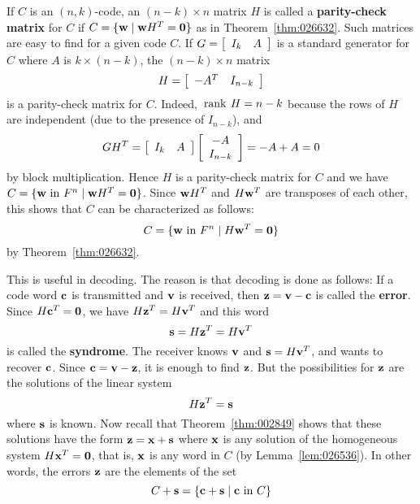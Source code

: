 \noindent If $C$ is an $(n, k)$-code, an $(n - k) \times n$ matrix $H$ is called a \textbf{parity-check matrix} for $C$ if $C = \{\textbf{w} \mid \textbf{w}H^{T} = \textbf{0}\}$ as in Theorem~\ref{thm:026632}. Such matrices are easy to find for a given code $C$. If $G = 
\left[ \begin{array}{cc}
I_k & A
\end{array} \right]$ is a standard generator for $C$ where $A$ is $k \times (n - k)$, the $(n - k) \times n$ matrix
\begin{equation*}
H = \left[\begin{array}{cc}
-A^T & I_{n-k}
\end{array}\right]
\end{equation*}
is a parity-check matrix for $C$. Indeed, $\thinspace\operatorname{rank\medspace} H = n - k$ because the rows of $H$ are independent (due to the presence of $I_{n - k}$), and
\begin{equation*}
GH^T = \left[\begin{array}{cc}
I_{k} & A
\end{array}\right]\left[\begin{array}{c}
-A \\ 
I_{n-k}
\end{array}\right] = -A + A = 0
\end{equation*}
by block multiplication. Hence $H$ is a parity-check matrix for $C$ and we have $C = \{\textbf{w} \mbox{ in } F^{n} \mid \textbf{w}H^{T} = \textbf{0}\}$. Since $\textbf{w}H^{T}$ and $H\textbf{w}^{T}$ are transposes of each other, this shows that $C$ can be characterized as follows:
\begin{equation*}
C = \{\textbf{w} \mbox{ in } F^n \mid H \textbf{w}^T = \textbf{0} \}
\end{equation*}
by Theorem~\ref{thm:026632}.

This is useful in decoding. The reason is that decoding is done as follows: If a code word $\textbf{c}$ is transmitted and $\textbf{v}$ is received, then $\textbf{z} = \textbf{v} - \textbf{c}$ is called the \textbf{error}. Since $H\textbf{c}^{T} = \textbf{0}$, we have $H\textbf{z}^{T} = H\textbf{v}^{T}$ and this word
\begin{equation*}
\textbf{s} = H\textbf{z}^T = H\textbf{v}^T
\end{equation*}
is called the \textbf{syndrome}. The receiver knows $\textbf{v}$ and $\textbf{s} = H\textbf{v}^{T}$, and wants to recover $\textbf{c}$. Since $\textbf{c} = \textbf{v} - \textbf{z}$, it is enough to find $\textbf{z}$. But the possibilities for $\textbf{z}$ are the solutions of the linear system
\begin{equation*}
H\textbf{z}^T = \textbf{s}
\end{equation*}
where $\textbf{s}$ is known. Now recall that Theorem~\ref{thm:002849} shows that these solutions have the form $\textbf{z} = \textbf{x} + \textbf{s}$ where $\textbf{x}$ is any solution of the homogeneous system $H\textbf{x}^{T} = \textbf{0}$, that is, $\textbf{x}$ is any word in $C$ (by Lemma~\ref{lem:026536}). In other words, the errors $\textbf{z}$ are the elements of the set
\begin{equation*}
C + \textbf{s} = \{\textbf{c} + \textbf{s} \mid \textbf{c} \mbox{ in } C\}
\end{equation*}

